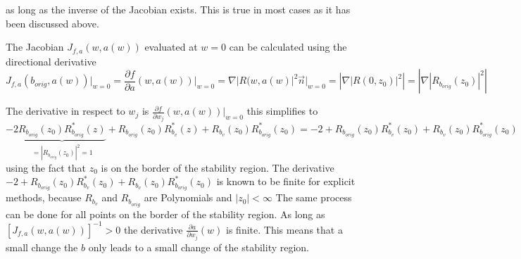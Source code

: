 \documentclass{article}
\begin{document}
as long as the inverse of the Jacobian exists. This is true in most cases as it has been discussed above.

The Jacobian $J_{f,a}(w,a(w))$ evaluated at $w=0$ can be calculated using the directional derivative 
$$ J_{f,a}(b_{orig},a(w)) \Big|_{w=0} = 
 \frac{\partial f}{\partial a} (w,a(w)) \Big|_{w=0} = 
 \nabla |R(w,a(w)|^2 \vec{n} \Big|_{w=0}
= \left| \nabla|R(0,z_0)|^2 \right| = \left| \nabla|R_{b_{orig}}(z_0)|^2 \right|$$ 


The derivative in respect to $w_j$ is 
$ \frac{\partial f}{\partial w_j}(w,a(w)) \Big|_{w=0}$
this simplifies to 
\begin{equation}\label{eq:derivative_to_b}
- 2 \underbrace{R_{b_{orig}}(z_0)R^*_{b_{orig}}(z)}_{=|R_{b_{orig}}(z_0)|^2=1} + R_{b_{orig}}(z_0)R^*_{b_v}(z) + R_{b_v}(z_0)R^*_{b_{orig}}(z_0) 
= -2 + R_{b_{orig}}(z_0)R^*_{b_v}(z_0) + R_{b_v}(z_0)R^*_{b_{orig}}(z_0)
\end{equation}
using the fact that $z_0$ is on the border of the stability region.
The derivative $-2 + R_{b_{orig}}(z_0)R^*_{b_v}(z_0) + R_{b_v}(z_0)R^*_{b_{orig}}(z_0)$ is known to be finite for explicit methods, because $R_{b_v}$ and $R_{b_{orig}}$ are Polynomials and $|z_0| < \infty$
The same process can be done for all points on the border of the stability region. 
As long as $\left[ J_{f,a}(w,a(w))  \right] ^{-1} > 0$ the derivative $\frac{\partial a}{\partial w_j} (w)$ is finite. This means that a small change the $b$ only leads to a small change of the stability region.
\end{document}
